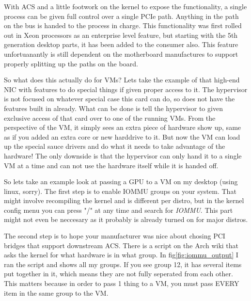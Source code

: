 \documentclass[12pt]{article}
\begin{document}
With ACS and a little footwork on the kernel to expose the functionality, a single process can be given full control over a single PCIe path.
Anything in the path on the bus is handed to the process in charge.
This functionality was first rolled out in Xeon processors as an enterprise level feature, but starting with the 5th generation desktop parts, it has been added to the consumer also.
This feature unfortuanantly is still dependent on the motherboard manufactures to support properly splitting up the paths on the board.

So what does this actually do for VMs?
Lets take the example of that high-end NIC with features to do special things if given proper access to it.
The hypervisor is not focused on whatever special case this card can do, so does not have the features built in already.
What can be done is tell the hypervisor to given exclusive access of that card over to one of the running VMs.
From the perspective of the VM, it simply sees an extra piece of hardware show up, same as if you added an extra core or new harddrive to it.
But now the VM can load up the special sauce drivers and do what it needs to take advantage of the hardware!
The only downside is that the hypervisor can only hand it to a single VM at a time and can not use the hardware itself while it is handed off.

So lets take an example look at passing a GPU to a VM on my desktop (using linux, sorry).
The first step is to enable IOMMU groups on your system.
That might involve recompiling the kernel and is different per distro, but in the kernel config menu you can press "/" at any time and search for \textit{IOMMU}.
This part might not even be neccesary as it probably is already turned on for major distros.

The second step is to hope your manufacturer was nice about chosing PCI bridges that support downstream ACS.
There is a script on the Arch wiki that asks the kernel for what hardware is in what group.\cite{wiki_arch_ovmf}
In fig\ref{fig:iommu_output} I ran the script and shows all my groups.
If you see group 12, it has several items put together in it, which means they are not fully seperated from each other.
This matters because in order to pass 1 thing to a VM, you must pass EVERY item in the same group to the VM.
\end{document}
